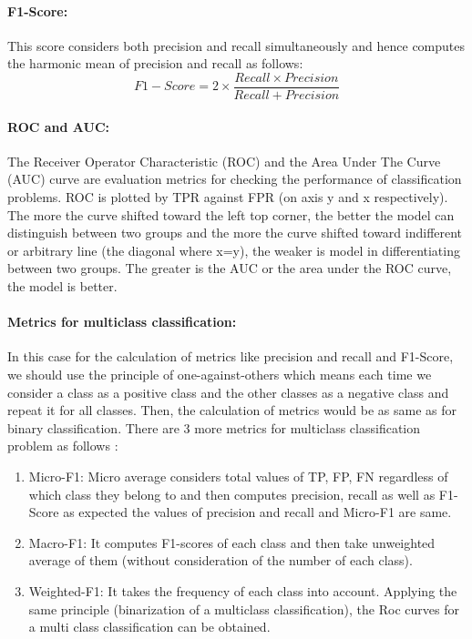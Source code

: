 \paragraph{F1-Score:}
This score considers both precision and recall simultaneously and hence computes the harmonic mean of precision and recall as follows:
\begin{equation}
    F1-Score = 2\times \frac{Recall\times  Precision}{Recall+  Precision}
\end{equation}
\paragraph{ROC and AUC:}
The Receiver Operator Characteristic (ROC) and the Area Under The Curve (AUC) curve are evaluation metrics for checking the performance of classification problems.
ROC is plotted by TPR against FPR (on axis y and x respectively). The more the curve shifted toward the left top corner, the better the model can distinguish between two groups and the more the curve shifted toward indifferent or arbitrary line (the diagonal where x=y), the weaker is model in differentiating between two groups. The greater is the AUC or the area under the ROC curve, the model is better.

\paragraph{Metrics for multiclass classification:}
In this case for the calculation of metrics like precision and recall and F1-Score, we should use the principle of one-against-others which means each time we consider a class as a positive class and the other classes as a negative class and repeat it for all classes. Then, the calculation of metrics would be as same as for binary classification.
There are 3 more metrics for multiclass classification problem as follows \cite{grandini2020metrics}:
\begin{enumerate}
\item Micro-F1: Micro average considers total values of TP, FP, FN regardless of which class they belong to and then computes precision, recall as well as F1-Score as expected the values of precision and recall and Micro-F1 are same.
\item Macro-F1: It computes F1-scores of each class and then take unweighted average of them (without consideration of the number of each class). 
\item Weighted-F1: It takes the frequency of each class into account.
Applying the same principle (binarization of a multiclass classification), the Roc curves for a multi class classification can be obtained.
\end{enumerate}
